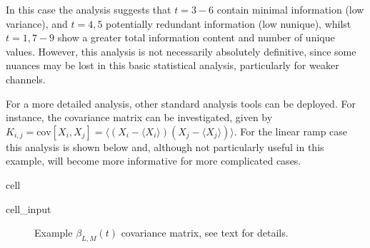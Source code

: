 \documentclass[letterpaper,table,10pt,english]{jupyterBook}
\begin{document}
\sphinxAtStartPar
In this case the analysis suggests that \(t=3 - 6\) contain minimal information (low variance), and \(t=4,5\) potentially redundant information (low nunique), whilst \(t=1,7 - 9\) show a greater total information content and number of unique values. However, this analysis is not necessarily absolutely definitive, since some nuances may be lost in this basic statistical analysis, particularly for weaker channels.

\sphinxAtStartPar
For a more detailed analysis, other standard analysis tools can be deployed. For instance, the covariance matrix can be investigated, given by \(K_{i,j}=\textrm{cov}[X_{i},X_{j}]=\langle(X_{i}-\langle X_{i}\rangle)(X_{j}-\langle X_{j}\rangle)\rangle\). For the linear ramp case this analysis is shown below and, although not particularly useful in this example, will become more informative for more complicated cases.

\begin{sphinxuseclass}{cell}\begin{sphinxVerbatimInput}

\begin{sphinxuseclass}{cell_input}
\begin{sphinxVerbatim}[commandchars=\\\{\}]
  

  
\end{sphinxVerbatim}

\end{sphinxuseclass}\end{sphinxVerbatimInput}

\end{sphinxuseclass}
\begin{figure}[htbp]
\centering
\capstart

\noindent{}
\caption{Example \(\beta_{L,M}(t)\) covariance matrix, see text for details.}\label{\detokenize{part1/theory_info_content_200723:fig-covmatblmexample}}\end{figure}
\end{document}
